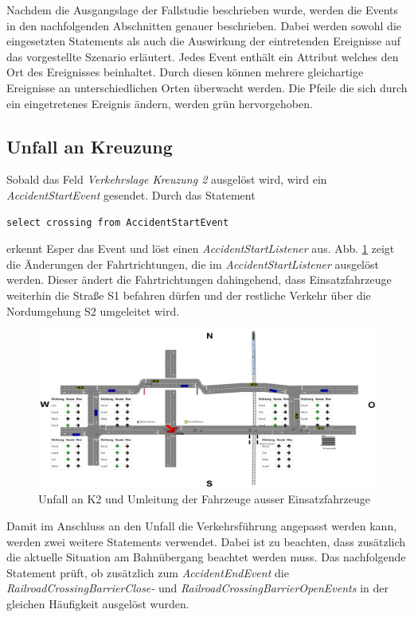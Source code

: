 Nachdem die Ausgangslage der Fallstudie beschrieben wurde, werden die Events in den nachfolgenden Abschnitten genauer beschrieben. Dabei werden sowohl die eingesetzten Statements als auch die Auswirkung der eintretenden Ereignisse auf das vorgestellte Szenario erläutert. Jedes Event enthält ein Attribut welches den Ort des Ereignisses beinhaltet. Durch diesen können mehrere gleichartige Ereignisse an unterschiedlichen Orten überwacht werden. Die Pfeile die sich durch ein eingetretenes Ereignis ändern, werden grün hervorgehoben.



\subsection{Unfall an Kreuzung} \label{accident}

Sobald das Feld \textit{Verkehrslage Kreuzung 2} ausgelöst wird, wird ein \textit{AccidentStartEvent} gesendet. Durch das Statement 

\begin{lstlisting}
select crossing from AccidentStartEvent
\end{lstlisting}

erkennt Esper das Event und löst einen \textit{AccidentStartListener} aus. Abb. \ref{fig6} zeigt die Änderungen der Fahrtrichtungen, die im \textit{AccidentStartListener} ausgelöst werden.  
Dieser ändert die Fahrtrichtungen dahingehend, dass Einsatzfahrzeuge weiterhin die Straße S1 befahren dürfen und der restliche Verkehr über die Nordumgehung S2 umgeleitet wird. 

\begin{figure}[ht]
	\includegraphics[width=\textwidth]{images/Accident.png}
	\caption{Unfall an K2 und Umleitung der Fahrzeuge ausser Einsatzfahrzeuge}
	\label{fig6}
\end{figure}

Damit im Anschluss an den Unfall die Verkehrsführung angepasst werden kann, werden zwei weitere Statements verwendet. Dabei ist zu beachten, dass zusätzlich die aktuelle Situation am Bahnübergang beachtet werden muss. Das nachfolgende Statement prüft, ob zusätzlich zum \textit{AccidentEndEvent} die \textit{RailroadCrossingBarrierClose-} und \textit{RailroadCrossingBarrierOpenEvents} in der gleichen Häufigkeit ausgelöst wurden. 

